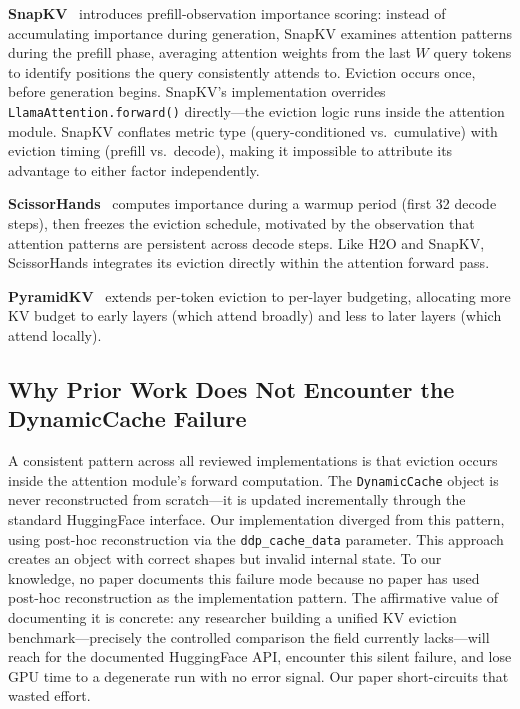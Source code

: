 \textbf{SnapKV}~\cite{li2024snapkv} introduces prefill-observation importance scoring: instead of accumulating importance during generation, SnapKV examines attention patterns during the prefill phase, averaging attention weights from the last $W$ query tokens to identify positions the query consistently attends to. Eviction occurs once, before generation begins. SnapKV's implementation overrides \texttt{LlamaAttention.forward()} directly---the eviction logic runs inside the attention module. SnapKV conflates metric type (query-conditioned vs.\ cumulative) with eviction timing (prefill vs.\ decode), making it impossible to attribute its advantage to either factor independently.

\textbf{ScissorHands}~\cite{liu2023scissorhands} computes importance during a warmup period (first 32 decode steps), then freezes the eviction schedule, motivated by the observation that attention patterns are persistent across decode steps. Like H2O and SnapKV, ScissorHands integrates its eviction directly within the attention forward pass.

\textbf{PyramidKV}~\cite{cai2024pyramidkv} extends per-token eviction to per-layer budgeting, allocating more KV budget to early layers (which attend broadly) and less to later layers (which attend locally).

\subsection{Why Prior Work Does Not Encounter the DynamicCache Failure}
\label{sec:why_prior}

A consistent pattern across all reviewed implementations is that eviction occurs inside the attention module's forward computation. The \texttt{DynamicCache} object is never reconstructed from scratch---it is updated incrementally through the standard HuggingFace interface. Our implementation diverged from this pattern, using post-hoc reconstruction via the \texttt{ddp\_cache\_data} parameter. This approach creates an object with correct shapes but invalid internal state. To our knowledge, no paper documents this failure mode because no paper has used post-hoc reconstruction as the implementation pattern. The affirmative value of documenting it is concrete: any researcher building a unified KV eviction benchmark---precisely the controlled comparison the field currently lacks---will reach for the documented HuggingFace API, encounter this silent failure, and lose GPU time to a degenerate run with no error signal. Our paper short-circuits that wasted effort.
